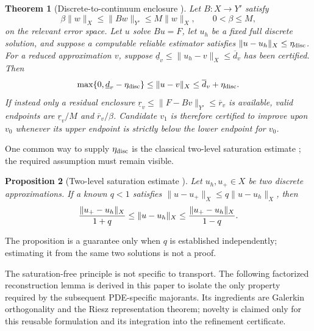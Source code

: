 \documentclass[11pt]{article}
\newtheorem{theorem}{Theorem}[section]
\newtheorem{proposition}[theorem]{Proposition}
\numberwithin{algorithm}{section}
\theoremstyle{definition}\newtheorem{definition}[theorem]{Definition}
\theoremstyle{remark}\newtheorem{remark}[theorem]{Remark}
\begin{document}
\begin{theorem}[Discrete-to-continuum enclosure
  {\cite{demkowiczgopalakrishnan2011,ciarlet1978}}]
\label{thm:discrete-continuum-enclosure}
Let $B:X\to Y'$ satisfy
\[
 \beta\|w\|_X\leq \|Bw\|_{Y'}\leq M\|w\|_X,
 \qquad 0<\beta\leq M,
\]
on the relevant error space.  Let $u$ solve $Bu=F$, let $u_h$ be a fixed full
discrete solution, and suppose a computable reliable estimator satisfies
$\|u-u_h\|_X\leq\eta_{\rm disc}$.  For a reduced approximation $v$, suppose
$\underline d_v\leq\|u_h-v\|_X\leq\overline d_v$ has been certified.  Then
\begin{equation}
 \max\{0,\underline d_v-\eta_{\rm disc}\}
 \leq \|u-v\|_X \leq
 \overline d_v+\eta_{\rm disc}.
 \label{eq:continuum-combined-interval}
\end{equation}
If instead only a residual enclosure
$\underline r_v\leq\|F-Bv\|_{Y'}\leq\overline r_v$ is available, valid
endpoints are $\underline r_v/M$ and $\overline r_v/\beta$.  Candidate $v_1$
is therefore certified to improve upon $v_0$ whenever its upper endpoint is
strictly below the lower endpoint for $v_0$.
\end{theorem}

\secondarytheoryB
One common way to supply $\eta_{\rm disc}$ is the classical two-level
saturation estimate \cite{melenkwohlmuth2001}; the required assumption must
remain visible.
\begin{proposition}[Two-level saturation estimate
  {\cite{melenkwohlmuth2001}}]
\label{prop:two-level-saturation}
Let $u_h,u_+\in X$ be two discrete approximations.  If a known $q<1$ satisfies
$\|u-u_+\|_X\leq q\|u-u_h\|_X$, then
\begin{equation}
 {\|u_+-u_h\|_X\over1+q}
 \leq\|u-u_h\|_X\leq
 {\|u_+-u_h\|_X\over1-q}.
 \label{eq:two-level-saturation}
\end{equation}
\end{proposition}
The proposition is a guarantee only when $q$ is established independently;
estimating it from the same two solutions is not a proof.
\endsecondarytheoryB

The saturation-free principle is not specific to transport.  The following
factorized reconstruction lemma is derived in this paper to isolate the only
property required by the subsequent PDE-specific majorants.  Its ingredients
are Galerkin orthogonality and the Riesz representation theorem; novelty is
claimed only for this reusable formulation and its integration into the
refinement certificate.
\end{document}
